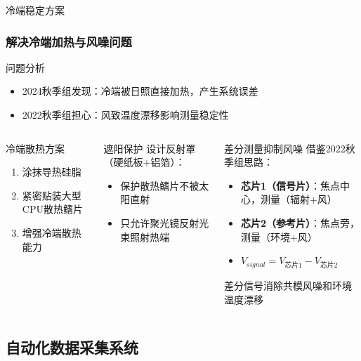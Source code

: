 \documentclass[aspectratio=169,11pt]{ctexbeamer}
\begin{document}
\begin{frame}{冷端稳定方案}
\frametitle{解决冷端加热与风噪问题}
\begin{block}{问题分析}
\begin{itemize}
    \item 2024秋季组发现：冷端被日照直接加热，产生系统误差
    \item 2022秋季组担心：风致温度漂移影响测量稳定性
\end{itemize}
\end{block}

\begin{columns}
\begin{block}{冷端散热方案}
\begin{enumerate}
    \item 涂抹导热硅脂
    \item 紧密贴装大型CPU散热鳍片
    \item 增强冷端散热能力
\end{enumerate}
\end{block}

\begin{block}{遮阳保护}
设计反射罩（硬纸板+铝箔）：
\begin{itemize}
    \item 保护散热鳍片不被太阳直射
    \item 只允许聚光镜反射光束照射热端
\end{itemize}
\end{block}

\begin{block}{差分测量抑制风噪}
借鉴2022秋季组思路：
\begin{itemize}
    \item \textbf{芯片1（信号片）}：焦点中心，测量（辐射+风）
    \item \textbf{芯片2（参考片）}：焦点旁，测量（环境+风）
    \item $V_{signal} = V_{芯片1} - V_{芯片2}$
\end{itemize}
差分信号消除共模风噪和环境温度漂移
\end{block}
\end{columns}
\end{frame}

\subsection{自动化数据采集系统}
\end{document}
